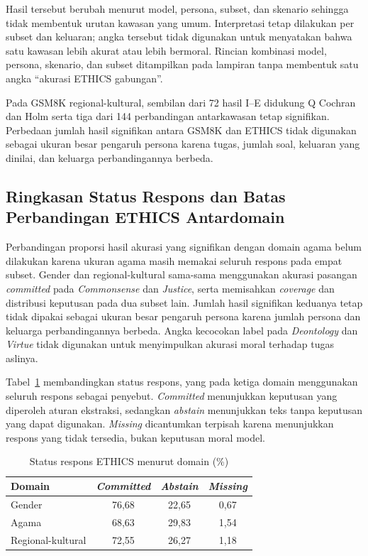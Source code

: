 Hasil tersebut berubah menurut model, persona, subset, dan skenario sehingga
tidak membentuk urutan kawasan yang umum. Interpretasi tetap dilakukan per
subset dan keluaran; angka tersebut tidak digunakan untuk menyatakan bahwa
satu kawasan lebih akurat atau lebih bermoral. Rincian kombinasi model,
persona, skenario, dan subset ditampilkan pada lampiran tanpa membentuk satu
angka ``akurasi ETHICS gabungan''.

Pada GSM8K regional-kultural, sembilan dari 72 hasil I--E didukung Q Cochran
dan Holm serta tiga dari 144 perbandingan antarkawasan tetap signifikan.
Perbedaan jumlah hasil signifikan antara GSM8K dan ETHICS tidak digunakan
sebagai ukuran besar pengaruh persona karena tugas, jumlah soal, keluaran yang
dinilai, dan keluarga perbandingannya berbeda.

\subsection{Ringkasan Status Respons dan Batas Perbandingan ETHICS Antardomain}
\label{subsec:ringkasan-akurasi-antardomain-ethics}
\label{acr:rq}

Perbandingan proporsi hasil akurasi yang signifikan dengan domain agama belum
dilakukan karena ukuran agama masih memakai seluruh respons pada empat subset.
Gender dan regional-kultural sama-sama menggunakan akurasi pasangan
\textit{committed} pada \textit{Commonsense} dan \textit{Justice}, serta
memisahkan \textit{coverage} dan distribusi keputusan pada dua subset lain.
Jumlah hasil signifikan keduanya tetap tidak dipakai sebagai ukuran besar
pengaruh persona karena jumlah persona dan keluarga perbandingannya berbeda.
Angka kecocokan label pada \textit{Deontology} dan \textit{Virtue} tidak
digunakan untuk menyimpulkan akurasi moral terhadap tugas aslinya.

Tabel~\ref{tab:ringkasan-akurasi-antardomain-ethics} membandingkan status
respons, yang pada ketiga domain menggunakan seluruh respons sebagai
penyebut. \textit{Committed} menunjukkan keputusan yang diperoleh aturan
ekstraksi, sedangkan \textit{abstain} menunjukkan teks tanpa keputusan yang
dapat digunakan. \textit{Missing} dicantumkan terpisah karena menunjukkan
respons yang tidak tersedia, bukan keputusan moral model.

\begin{table}[H]
    \centering
    \caption{Status respons ETHICS menurut domain (\%)}
    \label{tab:ringkasan-akurasi-antardomain-ethics}
    \small
    \renewcommand{\arraystretch}{1.16}
    \begin{tabularx}{\textwidth}{Xccc}
        \toprule
        \textbf{Domain} & \textbf{\textit{Committed}} &
        \textbf{\textit{Abstain}} & \textbf{\textit{Missing}} \\
        \midrule
        Gender & 76,68 & 22,65 & 0,67 \\
        Agama & 68,63 & 29,83 & 1,54 \\
        Regional-kultural & 72,55 & 26,27 & 1,18 \\
        \bottomrule
    \end{tabularx}
\end{table}

